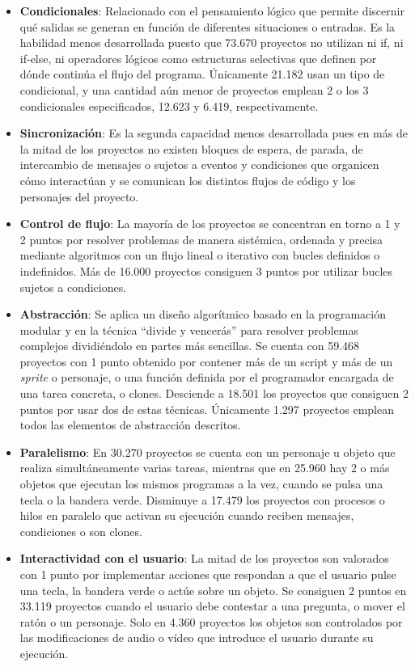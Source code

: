 \documentclass[a4paper, 12pt]{book}
\begin{document}
\begin{itemize}    
    \item \textbf{Condicionales}: Relacionado con el pensamiento lógico que permite discernir qué salidas se generan en función de diferentes situaciones o entradas. Es la habilidad menos desarrollada puesto que 73.670 proyectos no utilizan ni if, ni if-else, ni operadores lógicos como estructuras selectivas que definen por dónde continúa el flujo del programa. Únicamente 21.182 usan un tipo de condicional, y una cantidad aún menor de proyectos emplean 2 o los 3 condicionales especificados, 12.623 y 6.419, respectivamente.    
    \item \textbf{Sincronización}: Es la segunda capacidad menos desarrollada pues en más de la mitad de los proyectos no existen bloques de espera, de parada, de intercambio de mensajes o sujetos a eventos y condiciones que organicen cómo interactúan y se comunican los distintos flujos de código y los personajes del proyecto. %
    \item \textbf{Control de flujo}: La mayoría de los proyectos se concentran en torno a 1 y 2 puntos por resolver problemas de manera sistémica, ordenada y precisa mediante algoritmos con un flujo lineal o iterativo con bucles definidos o indefinidos.
    Más de 16.000 proyectos consiguen 3 puntos por utilizar bucles sujetos a condiciones.    
    \item \textbf{Abstracción}: Se aplica un diseño algorítmico basado en la programación modular y en la técnica ``divide y vencerás'' para resolver problemas complejos dividiéndolo en partes más sencillas. Se cuenta con 59.468 proyectos con 1 punto obtenido por contener más de un script y más de un \emph{sprite} o personaje, o una función definida por el programador encargada de una tarea concreta, o clones. Desciende a 18.501 los proyectos que consiguen 2 puntos por usar dos de estas técnicas. Únicamente 1.297 proyectos emplean todos las elementos de abstracción descritos.    
    \item \textbf{Paralelismo}: En 30.270 proyectos se cuenta con un personaje u objeto que realiza simultáneamente varias tareas, mientras que en 25.960 hay 2 o más objetos que ejecutan los mismos programas a la vez, cuando se pulsa una tecla o la bandera verde.
    Disminuye a 17.479 los proyectos con procesos o hilos en paralelo que activan su ejecución cuando reciben mensajes, condiciones o son clones.    
    \item \textbf{Interactividad con el usuario}: La mitad de los proyectos son valorados con 1 punto por implementar acciones que respondan a que el usuario pulse una tecla, la bandera verde o actúe sobre un objeto. Se consiguen 2 puntos en 33.119 proyectos cuando el usuario debe contestar a una pregunta, o mover el ratón o un personaje. Solo en 4.360 proyectos los objetos son controlados por las modificaciones de audio o vídeo que introduce el usuario durante su ejecución.    

\end{itemize}
\end{document}
